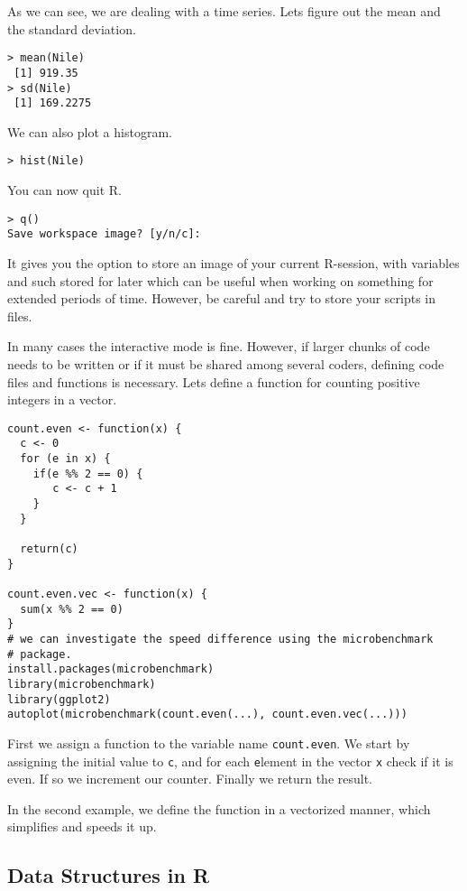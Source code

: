 \documentclass{article}[11pt]
\begin{document}
As we can see, we are dealing with a time series. Lets figure out the
mean and the standard deviation.

\begin{verbatim}
> mean(Nile)
 [1] 919.35
> sd(Nile)
 [1] 169.2275
\end{verbatim}

We can also plot a histogram.

\begin{verbatim}
> hist(Nile)
\end{verbatim}

You can now quit R.

\begin{verbatim}
> q()
Save workspace image? [y/n/c]: 
\end{verbatim}

It gives you the option to store an image of your current R-session,
with variables and such stored for later which can be useful when
working on something for extended periods of time. However, be careful
and try to store your scripts in files.

In many cases the interactive mode is fine. However, if larger chunks
of code needs to be written or if it must be shared among several
coders, defining code files and functions is necessary. Lets define a
function for counting positive integers in a vector.


\begin{verbatim}
count.even <- function(x) {
  c <- 0
  for (e in x) {
    if(e %% 2 == 0) {
       c <- c + 1
    }
  }

  return(c)
}

count.even.vec <- function(x) {
  sum(x %% 2 == 0)
}
# we can investigate the speed difference using the microbenchmark
# package. 
install.packages(microbenchmark)
library(microbenchmark)
library(ggplot2)
autoplot(microbenchmark(count.even(...), count.even.vec(...)))
\end{verbatim}

First we assign a function to the variable name
\texttt{count.even}. We start by assigning the initial value to
\texttt{c}, and for each \texttt{e}lement in the vector \texttt{x}
check if it is even. If so we increment our counter. Finally we return
the result.

In the second example, we define the function in a vectorized manner,
which simplifies and speeds it up.

\subsection*{Data Structures in R}
\end{document}

